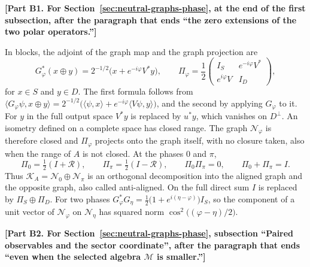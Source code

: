 \par\medskip\noindent\textbf{[Part B1. For Section~\ref{sec:neutral-graphs-phase}, at the end of the first subsection, after the paragraph that ends ``the zero extensions of the two polar operators.'']}\par\smallskip

In blocks, the adjoint of the graph map and the graph projection are
\begin{equation}
 G_\varphi^*(x\oplus y)=2^{-1/2}\bigl(x+e^{-i\varphi}V^*y\bigr),\qquad
 \Pi_\varphi=\frac12\begin{pmatrix}I_S&e^{-i\varphi}V^*\\ e^{i\varphi}V&I_D\end{pmatrix},
 \label{eq:graph-adjoint-blocks}
\end{equation}
for $x\in S$ and $y\in D$. The first formula follows from $\langle G_\varphi\psi,x\oplus y\rangle=2^{-1/2}\bigl(\langle\psi,x\rangle+e^{-i\varphi}\langle V\psi,y\rangle\bigr)$, and the second by applying $G_\varphi$ to it. For $y$ in the full output space $V^*y$ is replaced by $u^*y$, which vanishes on $D^\perp$. An isometry defined on a complete space has closed range. The graph $\mathcal N_\varphi$ is therefore closed and $\Pi_\varphi$ projects onto the graph itself, with no closure taken, also when the range of $A$ is not closed. At the phases $0$ and $\pi$,
\begin{equation}
 \Pi_0=\tfrac12(I+\mathcal R),\qquad \Pi_\pi=\tfrac12(I-\mathcal R),\qquad
 \Pi_0\Pi_\pi=0,\qquad \Pi_0+\Pi_\pi=I .
 \label{eq:graph-aligned-opposite}
\end{equation}
Thus $\mathcal K_A=\mathcal N_0\oplus\mathcal N_\pi$ is an orthogonal decomposition into the aligned graph and the opposite graph, also called anti-aligned. On the full direct sum $I$ is replaced by $\Pi_S\oplus\Pi_D$. For two phases $G_\varphi^*G_\eta=\tfrac12\bigl(1+e^{i(\eta-\varphi)}\bigr)I_S$, so the component of a unit vector of $\mathcal N_\varphi$ on $\mathcal N_\eta$ has squared norm $\cos^2\bigl((\varphi-\eta)/2\bigr)$.

\par\medskip\noindent\textbf{[Part B2. For Section~\ref{sec:neutral-graphs-phase}, subsection ``Paired observables and the sector coordinate'', after the paragraph that ends ``even when the selected algebra $\mathcal M$ is smaller.'']}\par\smallskip

